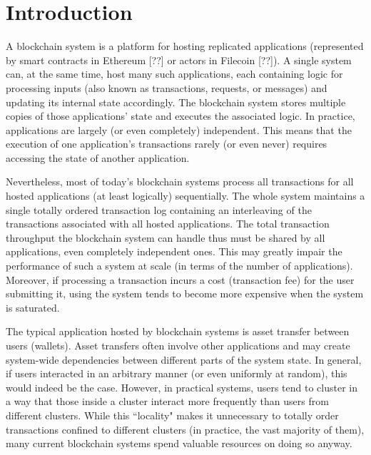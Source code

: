 \section{Introduction}
\label{sec:introduction}

A blockchain system is a platform for hosting replicated applications (represented by smart contracts in Ethereum [??] or actors in Filecoin [??]).
A single system can, at the same time, host many such applications,
each containing logic for processing inputs (also known as transactions, requests, or messages) and updating its internal state accordingly.
The blockchain system stores multiple copies of those applications' state and executes the associated logic.
In practice, applications are largely (or even completely) independent.
This means that the execution of one application's transactions rarely (or even never) requires accessing the state of another application.

Nevertheless, most of today's blockchain systems process all transactions for all hosted applications (at least logically) sequentially.
The whole system maintains a single totally ordered transaction log containing an interleaving of the transactions associated with all hosted applications.
The total transaction throughput the blockchain system can handle thus must be shared by all applications, even completely independent ones.
This may greatly impair the performance of such a system at scale (in terms of the number of applications).
Moreover, if processing a transaction incurs a cost (transaction fee) for the user submitting it, using the system tends to become more expensive when the system is saturated.

The typical application hosted by blockchain systems is asset transfer between users (wallets).
Asset transfers often involve other applications and may create system-wide dependencies between different parts of the system state.
In general, if users interacted in an arbitrary manner (or even uniformly at random), this would indeed be the case.
However, in practical systems, users tend to cluster in a way that those inside a cluster interact more frequently than users from different clusters.
While this ``locality" makes it unnecessary to totally order transactions confined to different clusters (in practice, the vast majority of them),
many current blockchain systems spend valuable resources on doing so anyway.


